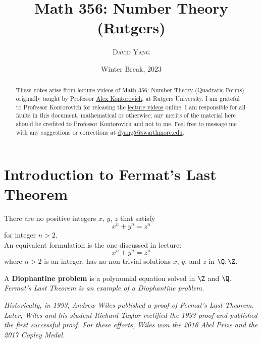 \documentclass[11pt]{article}
\begin{document}
\title{\LARGE \textbf{Math 356: Number Theory (Rutgers)}}
\date{Winter Break, 2023}
\author{\textsc{David Yang}}

\maketitle

\begin{abstract}
These notes arise from lecture videos of Math 356: Number Theory (Quadratic Forms), originally taught by 
Professor \href{https://sites.math.rutgers.edu/~alexk/}{Alex Kontorovich}, at Rutgers University. I am grateful
to Professor Kontorovich for releasing the \href{https://www.youtube.com/playlist?list=PLs6rMe3K87LEwc77iVba5AsAUPC1qVowy}{lecture videos} online. 
I am responsible for all faults in this document, mathematical or otherwise; any merits of the
material here should be credited to Professor Kontorovich and not to me.
Feel free to message me with any suggestions or corrections at \href{mailto:dyang5@swarthmore.edu}{dyang5@swarthmore.edu}.
\end{abstract}

\tableofcontents

\newpage

\section{Introduction to Fermat's Last Theorem}

\begin{theorem}
There are no positive integers $x$, $y$, $z$ that satisfy \[x^n + y^n = z^n\]
for integer $n > 2$. \\

An equivalent formulation is the one discussed in lecture:
\[
    x^n + y^n = z^n
\] where $n > 2$ is an integer, has no non-trivial solutions $x$, $y$, and $z$ in $\Q, \Z$.
\end{theorem}

\begin{definition}
A \textbf{Diophantine problem} is a polynomial equation solved in $\Z$ and $\Q$. \\

\textit{Fermat's Last Theorem is an example of a Diophantine problem.}
\end{definition}

\textit{Historically, in 1993, Andrew Wiles published a proof of Fermat's Last Theorem. Later, Wiles and his student Richard Taylor rectified the 1993 proof and published
the first successful proof. For these efforts, Wiles won the 2016 Abel Prize and
the 2017 Copley Medal.} \\
\end{document}
